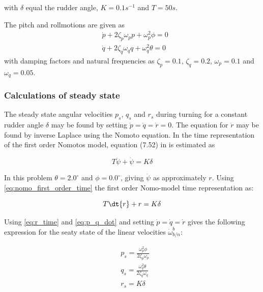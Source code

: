 with $\delta$ equal the rudder angle, $K =0.1 s^{-1}$ and $T = 50s$.

The pitch and rollmotions are given as
\begin{equation}
\begin{aligned}
	&\dot{p} + 2\zeta_p\omega_p p + \omega_p^2 \phi = 0\\
	&\dot{q} + 2\zeta_q\omega_q q + \omega_q^2 \theta = 0
	\label{eq:p_q_dot}
\end{aligned}
\end{equation}
with damping factors and natural  frequencies as $\zeta_p = 0.1 $, $\zeta_q = 0.2 $, $\omega_p = 0.1 $ and $\omega_q = 0.05 $. 

\subsubsection*{Calculations of steady state}

The steady state angular velocities $p_s$, $q_s$ and $r_s$ during turning for a constant rudder angle $\delta$ may be found by setting $\dot{p}= \dot{q} = \dot{r} = 0$. The equation for $\dot{r}$ may be found by inverse Laplace using the Nomoto equation. In \cite{Fossen2011} the time representation of the first order Nomotos model, equation (7.52) in \cite{Fossen2011} is estimated as 

\begin{equation}
    T \ddot{\psi} + \dot{\psi} = K \delta
    \label{eq:nomo_first_order_time}
\end{equation}

In this problem $\theta = 2.0 ^\circ$ and $\phi = 0.0 ^\circ$, giving $\dot{\psi}$ as approximately $r$. Using \eqref{eq:nomo_first_order_time} the  first order Nomo-model time representation as:

\begin{equation}
    T \dt{r} + r = K \delta
    \label{eq:r_time}
\end{equation}

Using \eqref{eq:r_time} and \eqref{eq:p_q_dot} and setting $\dot{p} =\dot{q} = \dot{r}$ gives the following expression for the seaty state of the linear velocities $\dot{\omega}^b_{b/n}$:

\begin{equation}
\begin{aligned}
	& p_s = \frac{\omega_p^2 \phi}{ 2\zeta_p\omega_p} \\
	& q_s = \frac{\omega_q^2 \theta}{2\zeta_q\omega_q} \\
	& r_s = K \delta
	\label{eq:p_q_dot}
\end{aligned}
\end{equation}

